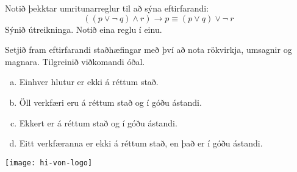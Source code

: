 \documentclass{exam}
\begin{document}
\begin{questions}
\question Notið þekktar umritunarreglur til að sýna eftirfarandi:
\[ (( p \lor \lnot ~q) \land r) \rightarrow p \equiv (p \lor q) \lor \lnot ~r \]
Sýnið útreikninga. Notið eina reglu í einu.

\question Setjið fram eftirfarandi staðhæfingar með því að nota rökvirkja, umsagnir og magnara. Tilgreinið viðkomandi óðal.
\begin{enumerate}[a)]
 \item Einhver hlutur er ekki á réttum stað.
 \item Öll verkfæri eru á réttum stað og í góðu ástandi.
 \item Ekkert er á réttum stað og í góðu ástandi.
 \item Eitt verkfæranna er ekki á réttum stað, en það er í góðu ástandi.
\end{enumerate}

\end{questions}

\vfill
\texttt{[image: hi-von-logo]}
\end{document}
